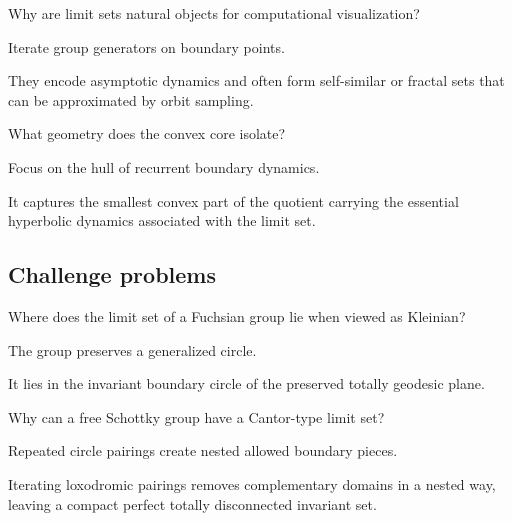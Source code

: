 \begin{exercise}\label{exr:vii37-ped-13}
Why are limit sets natural objects for computational visualization?
\end{exercise}

\begin{hint}
Iterate group generators on boundary points.
\end{hint}

\begin{solution}
They encode asymptotic dynamics and often form self-similar or fractal sets that can be approximated by orbit sampling.
\end{solution}

\begin{exercise}\label{exr:vii37-ped-14}
What geometry does the convex core isolate?
\end{exercise}

\begin{hint}
Focus on the hull of recurrent boundary dynamics.
\end{hint}

\begin{solution}
It captures the smallest convex part of the quotient carrying the essential hyperbolic dynamics associated with the limit set.
\end{solution}

\subsection*{Challenge problems}

\begin{exercise}\label{exr:vii37-ped-15}
Where does the limit set of a Fuchsian group lie when viewed as Kleinian?
\end{exercise}

\begin{hint}
The group preserves a generalized circle.
\end{hint}

\begin{solution}
It lies in the invariant boundary circle of the preserved totally geodesic plane.
\end{solution}

\begin{exercise}\label{exr:vii37-ped-16}
Why can a free Schottky group have a Cantor-type limit set?
\end{exercise}

\begin{hint}
Repeated circle pairings create nested allowed boundary pieces.
\end{hint}

\begin{solution}
Iterating loxodromic pairings removes complementary domains in a nested way, leaving a compact perfect totally disconnected invariant set.
\end{solution}

